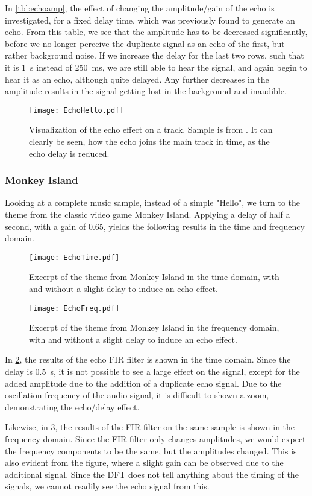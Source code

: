 In \cref{tbl:echoamp}, the effect of changing the amplitude/gain of the echo is investigated, for a fixed delay time, which was previously found to generate an echo. From this table, we see that the amplitude has to be decreased significantly, before we no longer perceive the duplicate signal as an echo of the first, but rather background noise. If we increase the delay for the last two rows, such that it is \SI{1}{\second} instead of \SI{250}{\milli\second}, we are still able to hear the signal, and again begin to hear it as an echo, although quite delayed. Any further decreases in the amplitude results in the signal getting lost in the background and inaudible.

\begin{figure}[!hbt]
	\centering
	\texttt{[image: EchoHello.pdf]}
	\caption{Visualization of the echo effect on a track. Sample is from \cite{audiohello}. It can clearly be seen, how the echo joins the main track in time, as the echo delay is reduced.}
	\label{fig:echohello}
\end{figure}

\subsubsection{Monkey Island}
Looking at a complete music sample, instead of a simple "Hello", we turn to the theme from the classic video game Monkey Island. Applying a delay of half a second, with a gain of \num{0.65}, yields the following results in the time and frequency domain.

\begin{figure}[!hbt]
	\centering
	\texttt{[image: EchoTime.pdf]}
	\caption{Excerpt of the theme from Monkey Island in the time domain, with and without a slight delay to induce an echo effect.}
	\label{fig:echotime}
\end{figure}

\begin{figure}[!hbt]
	\centering
	\texttt{[image: EchoFreq.pdf]}
	\caption{Excerpt of the theme from Monkey Island in the frequency domain, with and without a slight delay to induce an echo effect.}
	\label{fig:echofreq}
\end{figure}

In \cref{fig:echotime}, the results of the echo FIR filter is shown in the time domain. Since the delay is \SI{0.5}{\second}, it is not possible to see a large effect on the signal, except for the added amplitude due to the addition of a duplicate echo signal. Due to the oscillation frequency of the audio signal, it is difficult to shown a zoom, demonstrating the echo/delay effect.

Likewise, in \cref{fig:echofreq}, the results of the FIR filter on the same sample is shown in the frequency domain. Since the FIR filter only changes amplitudes, we would expect the frequency components to be the same, but the amplitudes changed. This is also evident from the figure, where a slight gain can be observed due to the additional signal. Since the DFT does not tell anything about the timing of the signals, we cannot readily see the echo signal from this.

